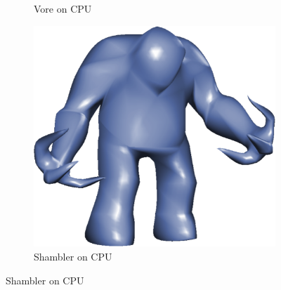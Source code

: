 \begin{figure}
\begin{subfigure}[b]{0.2\textwidth}
		\caption{Vore on CPU}
		\label{fig:results:cpugpu:cpuVore}
	\end{subfigure}	
	\hspace{0.1\textwidth}
	\begin{subfigure}[b]{0.2\textwidth}
		\centering
		\includegraphics[width=\textwidth]{content/img/results/shamblercpu.png}
		\caption{Shambler on CPU}
		\label{fig:results:cpugpu:cpuShambler}
	\end{subfigure}		


\end{figure}

